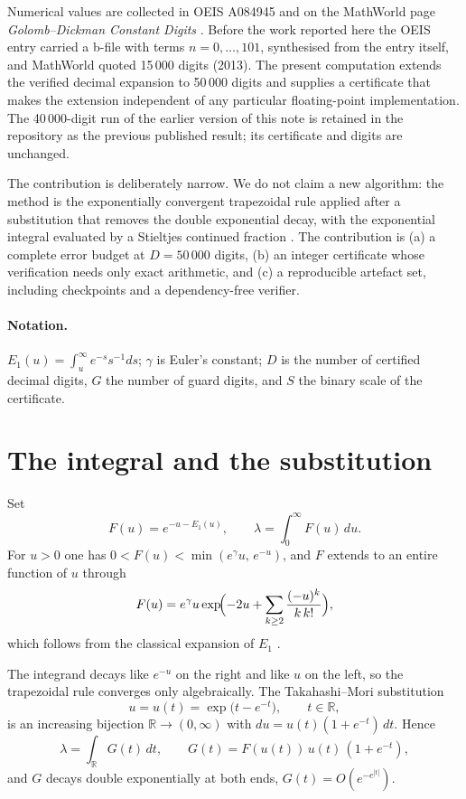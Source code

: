 \documentclass[11pt,a4paper]{article}
\theoremstyle{remark}
\newcommand{\Eone}{E_1}
\newcommand{\lam}{\lambda}
\newcommand{\R}{\mathbb{R}}
\begin{document}
Numerical values are collected in OEIS A084945 \cite{oeisA084945} and on
the MathWorld page \emph{Golomb--Dickman Constant Digits}
\cite{mathworld}. Before the work reported here the OEIS entry carried a
b-file with terms $n=0,\ldots,101$, synthesised from the entry itself,
and MathWorld quoted 15\,000 digits (2013). The present computation
extends the verified decimal expansion to 50\,000 digits and supplies a
certificate that makes the extension independent of any particular
floating-point implementation. The 40\,000-digit run of the earlier
version of this note is retained in the repository as the previous
published result; its certificate and digits are unchanged.

The contribution is deliberately narrow. We do not claim a new
algorithm: the method is the exponentially convergent trapezoidal rule
\cite{TW2014} applied after a substitution that removes the double
exponential decay, with the exponential integral evaluated by a
Stieltjes continued fraction \cite{stieltjes1894}. The contribution is
(a) a complete error budget at $D=50\,000$ digits, (b) an integer
certificate whose verification needs only exact arithmetic, and (c) a
reproducible artefact set, including checkpoints and a dependency-free
verifier.

\paragraph{Notation.}
$\Eone(u)=\int_u^\infty e^{-s}s^{-1}ds$; $\gamma$ is Euler's constant;
$D$ is the number of certified decimal digits, $G$ the number of guard
digits, and $S$ the binary scale of the certificate.

\section{The integral and the substitution}

Set
\begin{equation}
  F(u)=e^{-u-\Eone(u)},\qquad \lam=\int_0^\infty F(u)\,du .
\end{equation}
For $u>0$ one has $0<F(u)<\min(e^\gamma u,\,e^{-u})$, and $F$ extends to
an entire function of $u$ through
\begin{equation}
  F(u)=e^{\gamma}u\exp\!\Bigl(-2u+\sum_{k\ge2}\frac{(-u)^k}{k\,k!}\Bigr),
  \label{eq:Fseries}
\end{equation}
which follows from the classical expansion of $\Eone$
\cite[5.1.11]{AS1964}.

The integrand decays like $e^{-u}$ on the right and like $u$ on the
left, so the trapezoidal rule converges only algebraically. The
Takahashi--Mori substitution
\begin{equation}
  u=u(t)=\exp\bigl(t-e^{-t}\bigr),\qquad t\in\R,
  \label{eq:subst}
\end{equation}
is an increasing bijection $\R\to(0,\infty)$ with
$du=u(t)(1+e^{-t})\,dt$. Hence
\begin{equation}
  \lam=\int_{\R}G(t)\,dt,\qquad
  G(t)=F(u(t))\,u(t)\,(1+e^{-t}),
  \label{eq:G}
\end{equation}
and $G$ decays double exponentially at both ends,
$G(t)=O(e^{-e^{|t|}})$.
\end{document}
